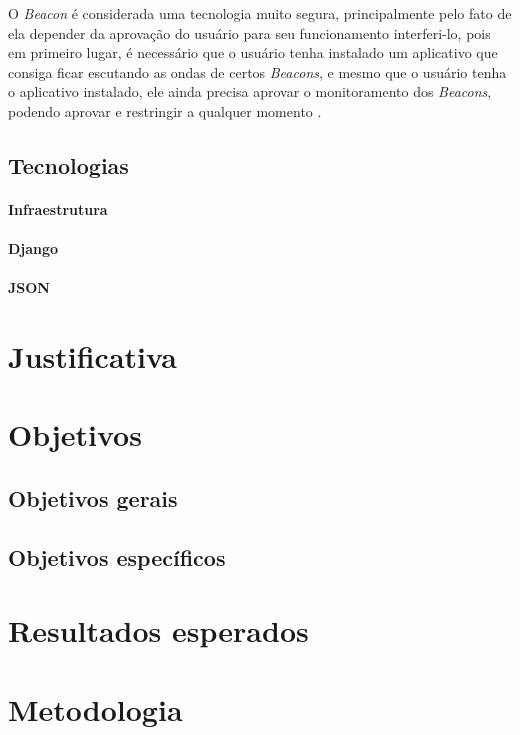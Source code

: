 \documentclass[
	12pt,
	oneside,
	a4paper,
	english,
	brazil,
]{abntex2}
\begin{document}
O \emph{Beacon} é considerada uma tecnologia muito segura, principalmente pelo fato de ela depender da aprovação do usuário para seu funcionamento interferi-lo, pois em primeiro lugar, é necessário que o usuário tenha instalado um aplicativo que consiga ficar escutando as ondas de certos \emph{Beacons}, e mesmo que o usuário tenha o aplicativo instalado, ele ainda precisa aprovar o monitoramento dos \emph{Beacons}, podendo aprovar e restringir a qualquer momento \cite{beacon-what-is-it-forbes}.

\section{Tecnologias}
\subsubsection{Infraestrutura}
\subsubsection{Django}
\subsubsection{JSON}


\chapter{Justificativa}

\chapter{Objetivos}
\section{Objetivos gerais}
\section{Objetivos específicos}

\chapter{Resultados esperados}

\chapter{Metodologia}
\end{document}
